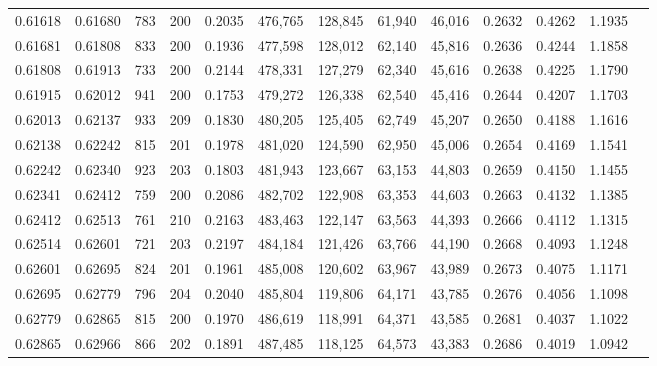 \begin{tabular}{rrrrrrrrrrrrr}
0.61618 & 0.61680 &   783 & 200 &                                     0.2035 & 476,765 & 128,845 &  61,940 &  46,016 & 0.2632 & 0.4262 & 1.1935 \\
0.61681 & 0.61808 &   833 & 200 &                                     0.1936 & 477,598 & 128,012 &  62,140 &  45,816 & 0.2636 & 0.4244 & 1.1858 \\
0.61808 & 0.61913 &   733 & 200 &                                     0.2144 & 478,331 & 127,279 &  62,340 &  45,616 & 0.2638 & 0.4225 & 1.1790 \\
0.61915 & 0.62012 &   941 & 200 &                                     0.1753 & 479,272 & 126,338 &  62,540 &  45,416 & 0.2644 & 0.4207 & 1.1703 \\
0.62013 & 0.62137 &   933 & 209 &                                     0.1830 & 480,205 & 125,405 &  62,749 &  45,207 & 0.2650 & 0.4188 & 1.1616 \\
0.62138 & 0.62242 &   815 & 201 &                                     0.1978 & 481,020 & 124,590 &  62,950 &  45,006 & 0.2654 & 0.4169 & 1.1541 \\
0.62242 & 0.62340 &   923 & 203 &                                     0.1803 & 481,943 & 123,667 &  63,153 &  44,803 & 0.2659 & 0.4150 & 1.1455 \\
0.62341 & 0.62412 &   759 & 200 &                                     0.2086 & 482,702 & 122,908 &  63,353 &  44,603 & 0.2663 & 0.4132 & 1.1385 \\
0.62412 & 0.62513 &   761 & 210 &                                     0.2163 & 483,463 & 122,147 &  63,563 &  44,393 & 0.2666 & 0.4112 & 1.1315 \\
0.62514 & 0.62601 &   721 & 203 &                                     0.2197 & 484,184 & 121,426 &  63,766 &  44,190 & 0.2668 & 0.4093 & 1.1248 \\
0.62601 & 0.62695 &   824 & 201 &                                     0.1961 & 485,008 & 120,602 &  63,967 &  43,989 & 0.2673 & 0.4075 & 1.1171 \\
0.62695 & 0.62779 &   796 & 204 &                                     0.2040 & 485,804 & 119,806 &  64,171 &  43,785 & 0.2676 & 0.4056 & 1.1098 \\
0.62779 & 0.62865 &   815 & 200 &                                     0.1970 & 486,619 & 118,991 &  64,371 &  43,585 & 0.2681 & 0.4037 & 1.1022 \\
0.62865 & 0.62966 &   866 & 202 &                                     0.1891 & 487,485 & 118,125 &  64,573 &  43,383 & 0.2686 & 0.4019 & 1.0942 \\

\end{tabular}
